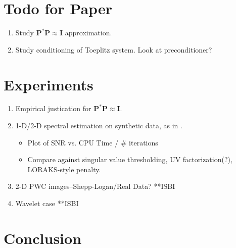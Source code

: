 \documentclass[10pt, twocolumn, twoside]{IEEEtran}
\newcommand{\mbf}{\mathbf}
\begin{document}
\section{Todo for Paper}
\begin{enumerate}
\item Study $\mbf P^* \mbf P \approx \mbf I$ approximation.
\item Study conditioning of Toeplitz system. Look at preconditioner?
\end{enumerate}
\section{Experiments}
\begin{enumerate}
\item Empirical justication for $\mbf P^* \mbf P \approx \mbf I$.
\item 1-D/2-D spectral estimation on synthetic data, as in \cite{chen2014robust}.
\begin{itemize}
\item Plot of SNR vs. CPU Time / \# iterations
\item Compare against singular value thresholding, UV factorization(?), LORAKS-style penalty.
\end{itemize}
\item 2-D PWC images--Shepp-Logan/Real Data? **ISBI
\item Wavelet case **ISBI
\end{enumerate}

\section{Conclusion}



\end{document}

